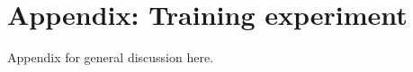 \chapter{Appendix: Training experiment\label{app10:generalDiscussion}}

Appendix for general discussion here.
